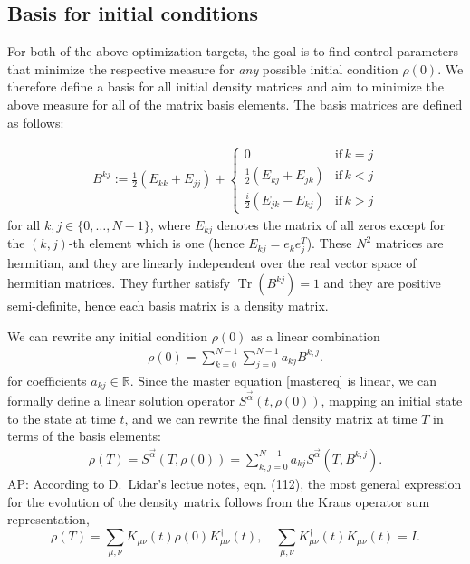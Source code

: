 \documentclass[letterpaper]{article}
\DeclareMathOperator{\Tr}{Tr}
\newcommand{\R}{\mathds{R}}
\begin{document}
\subsection{Basis for initial conditions}
For both of the above optimization targets, the goal is to find control parameters that minimize the respective measure for \textit{any} possible initial condition $\rho(0)$. We therefore define a basis for all initial density matrices and aim to minimize the above measure for all of the matrix basis elements. The basis matrices are defined as follows:

\begin{align}
B^{kj} := \frac 12 \left( E_{kk} + E_{jj}\right) +  \begin{cases} 
          0 & \text{if} \, k=j \\ 
        \frac 12 \left( E_{kj} + E_{jk}\right) & \text{if} \, k<j \\
        \frac i2 \left( E_{jk} - E_{kj}\right) & \text{if} \, k>j
      \end{cases} 
\end{align}
for all $k,j\in\{0,\dots, N-1\}$, where $E_{kj}$ denotes the matrix of all zeros except for the $(k,j)$-th element which is one (hence $E_{kj} = e_ke_j^T$). These $N^2$ matrices are hermitian, and they are linearly independent over the real vector space of hermitian matrices. They further satisfy $\Tr(B^{kj}) = 1$ and they are positive semi-definite, hence each basis matrix is a density matrix. 

We can rewrite any initial condition $\rho(0)$ as a linear combination 
\begin{align}
  \rho(0) = \sum_{k=0}^{N-1} \sum_{j=0}^{N-1} a_{kj} B^{k, j}.
\end{align}
for coefficients $a_{kj} \in \R$.
Since the master equation \eqref{mastereq} is linear, we can formally define a linear solution operator $S^{\vec{\alpha}}(t,\rho(0))$, mapping an initial state to the state at time $t$, and we can rewrite the final density matrix at time $T$ in terms of the basis elements:
\begin{align}
  \rho(T) = S^{\vec{\alpha}}(T,\rho(0)) = \sum_{k,j=0}^{N-1} a_{kj} S^{\vec{\alpha}}(T,B^{k, j}).
\end{align}
AP: According to D.~Lidar's lectue notes, eqn. (112), the most general expression for the evolution
of the density matrix follows from the Kraus operator sum representation,
\[
  \rho(T) = \sum_{\mu,\nu} K_{\mu\nu}(t) \rho(0) K_{\mu\nu}^\dagger(t),\quad \sum_{\mu,\nu}
  K_{\mu\nu}^\dagger(t)K_{\mu\nu}(t)=I.
\]
\end{document}
